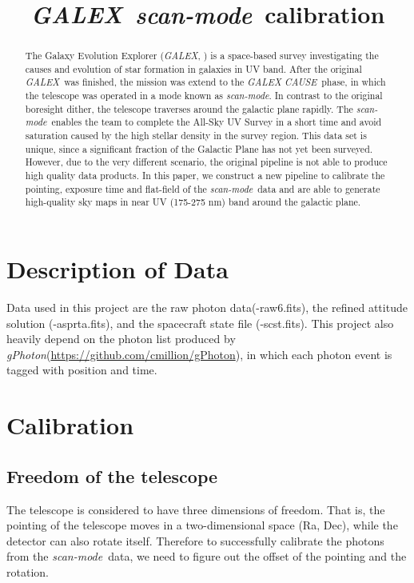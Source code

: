\documentclass[12pt, preprint]{aastex}
\newcommand{\project}[1]{\textsl{#1}}
\newcommand{\galex}{\project{GALEX}}
\newcommand{\cause}{\project{GALEX CAUSE}}
\newcommand{\scanmode}{\project{scan-mode}}
\newcommand{\gphoton}{\project{gPhoton}}
\begin{document}
\title{\galex\ \scanmode\ calibration}
\author{}

\begin{abstract}
The Galaxy Evolution Explorer (\galex, \citealt{galex}) is a space-based survey investigating the causes and evolution of star formation in galaxies in UV band.
After the original \galex\ was finished, the mission was extend to the \cause\ phase, in which the telescope was operated in a mode known as \scanmode.
In contrast to the original boresight dither, the telescope traverses around the galactic plane rapidly. 
The \scanmode\ enables the team to complete the All-Sky UV Survey in a short time and avoid saturation caused by the high stellar density in the survey region.
This data set is unique, since a significant fraction of the Galactic Plane has not yet been surveyed.
However, due to the very different scenario, the original pipeline is not able to produce high quality data products. 
In this paper, we construct a new pipeline to calibrate the pointing, exposure time and flat-field of the \scanmode\  data and are able to generate high-quality sky maps in near UV (175-275 nm) band around the galactic plane.

\end{abstract}

\section{Description of Data}
Data used in this project are the raw photon data(-raw6.fits), the refined attitude solution (-asprta.fits), and the spacecraft state file (-scst.fits). 
This project also heavily depend on the photon list produced by \gphoton (\url{https://github.com/cmillion/gPhoton}), in which each photon event is tagged with position and time.

\section{Calibration}

\subsection{Freedom of the telescope}
The telescope is considered to have three dimensions of freedom. 
That is, the pointing of the telescope moves in a two-dimensional space (Ra, Dec), while the detector can also rotate itself. 
Therefore to successfully calibrate the photons from the \scanmode\ data, we need to figure out the offset of the pointing and the rotation.
\end{document}
